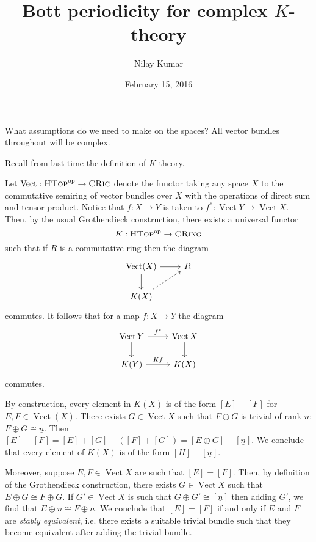 \documentclass{amsart}
\title{Bott periodicity for complex $K$-theory}
\author{Nilay Kumar}
\date{February 15, 2016}
\DeclareMathOperator{\Vect}{Vect}
\begin{document}
\maketitle

{\color{red} What assumptions do we need to make on the spaces?}
All vector bundles throughout will be complex.

Recall from last time the definition of $K$-theory.
\begin{definition}
    Let $\Vect:\textsc{HTop}^\text{op}\to\textsc{CRig}$ denote the functor taking any space $X$ to the commutative semiring
    of vector bundles over $X$ with the operations of direct sum and tensor product. Notice that $f:X\to Y$ is taken to
    $f^*:\Vect Y\to\Vect X$. Then, by the usual Grothendieck construction,  there exists a universal functor
    \begin{equation*}
        K:\textsc{HTop}^\text{op}\to\textsc{CRing}
    \end{equation*}
    such that if $R$ is a commutative ring then the diagram
    \begin{equation*}
        \begin{tikzcd}
            \Vect(X)\rar\dar & R\\
            K(X)\urar[dashed]
        \end{tikzcd}
    \end{equation*}
    commutes. It follows that for a map $f:X\to Y$ the diagram
    \begin{equation*}
        \begin{tikzcd}
            \Vect Y\rar{f^*}\dar & \Vect X\dar\\
            K(Y) \rar{Kf} & K(X)
        \end{tikzcd}
    \end{equation*}
    commutes.
\end{definition}

\begin{remark}
    By construction, every element in $K(X)$ is of the form $[E]-[F]$ for $E,F\in\Vect(X)$.
    There exists $G\in\Vect X$ such that $F\oplus G$ is trivial of rank $n$: $F\oplus G\cong\underline{n}$.
    Then $[E]-[F]=[E]+[G]-([F]+[G])=[E\oplus G]-[\underline{n}]$. We conclude that every element
    of $K(X)$ is of the form $[H]-[\underline{n}]$.

    Moreover, suppose $E,F\in\Vect X$ are such that $[E]=[F]$. Then, by definition of the Grothendieck
    construction, there exists $G\in\Vect X$ such that $E\oplus G\cong F\oplus G$. If $G'\in\Vect X$
    is such that $G\oplus G'\cong[\underline{n}]$ then adding $G'$, we find that $E\oplus\underline{n}\cong F\oplus\underline{n}$.
    We conclude that $[E]=[F]$ if and only if $E$ and $F$ are \textit{stably equivalent}, i.e. there exists
    a suitable trivial bundle such that they become equivalent after adding the trivial bundle.
\end{remark}
\end{document}
